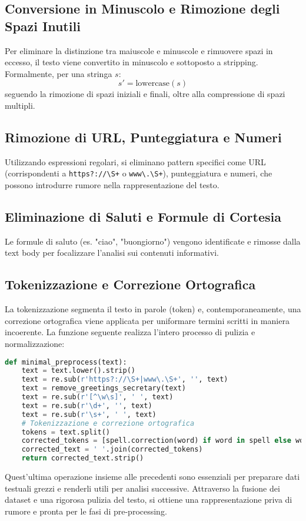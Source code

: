\subsection{Conversione in Minuscolo e Rimozione degli Spazi Inutili}
Per eliminare la distinzione tra maiuscole e minuscole e rimuovere spazi in eccesso, il testo viene convertito in minuscolo e sottoposto a stripping. Formalmente, per una stringa \( s \):
\[
s' = \text{lowercase}(s)
\]
seguendo la rimozione di spazi iniziali e finali, oltre alla compressione di spazi multipli.

\subsection{Rimozione di URL, Punteggiatura e Numeri}
Utilizzando espressioni regolari, si eliminano pattern specifici come URL (corrispondenti a \verb|https?://\S+| o \verb|www\.\S+|), punteggiatura e numeri, che possono introdurre rumore nella rappresentazione del testo.

\subsection{Eliminazione di Saluti e Formule di Cortesia}
Le formule di saluto (es. "ciao", "buongiorno") vengono identificate e rimosse dalla text body per focalizzare l'analisi sui contenuti informativi.

\subsection{Tokenizzazione e Correzione Ortografica}
La tokenizzazione segmenta il testo in parole (token) e, contemporaneamente, una correzione ortografica viene applicata per uniformare termini scritti in maniera incoerente. La funzione seguente realizza l'intero processo di pulizia e normalizzazione:

\begin{lstlisting}[language=Python,caption={Funzione minimal\_preprocess}]
def minimal_preprocess(text):
    text = text.lower().strip()
    text = re.sub(r'https?://\S+|www\.\S+', '', text)
    text = remove_greetings_secretary(text)
    text = re.sub(r'[^\w\s]', ' ', text)
    text = re.sub(r'\d+', '', text)
    text = re.sub(r'\s+', ' ', text)
    # Tokenizzazione e correzione ortografica
    tokens = text.split()
    corrected_tokens = [spell.correction(word) if word in spell else word for word in tokens]
    corrected_text = ' '.join(corrected_tokens)
    return corrected_text.strip()
\end{lstlisting}

Quest'ultima operazione insieme alle precedenti sono essenziali per preparare dati testuali grezzi e renderli utili per analisi successive. Attraverso la fusione dei dataset e una rigorosa pulizia del testo, si ottiene una rappresentazione priva di rumore e pronta per le fasi di pre-processing.